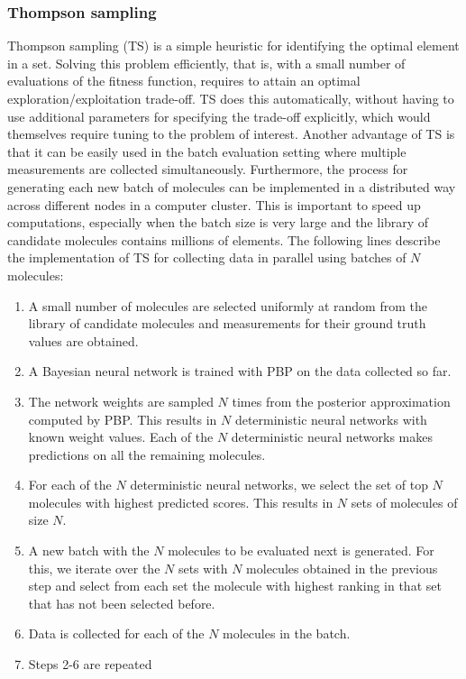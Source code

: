\subsubsection{Thompson sampling}

Thompson sampling (TS) \cite{Thompson_1933} is a simple heuristic for identifying the optimal element in a set. Solving this problem efficiently, that is, with a small number of evaluations of the fitness function, requires to attain an optimal exploration/exploitation trade-off. TS does this automatically, without having to use additional parameters for specifying the trade-off explicitly, which would themselves require tuning to the problem of interest. Another advantage of TS is that it can be easily used
in the batch evaluation setting where multiple measurements are collected simultaneously. Furthermore, the process for generating each new batch of molecules can be implemented in a distributed way across different nodes in a computer cluster. This is important to speed up computations, especially when the batch size is very large and the library of candidate molecules contains millions of elements. The following lines describe the implementation of TS for collecting data in parallel using batches of $N$ molecules:
\begin{enumerate}
\item A small number of molecules are selected uniformly at random from the library of candidate molecules and measurements for their ground truth values are obtained.
\item A Bayesian neural network is trained with PBP on the data collected so far.
\item The network weights are sampled $N$ times from the posterior approximation computed by PBP. This results in $N$ deterministic neural networks with known weight values. Each of the $N$ deterministic neural networks makes predictions on all the remaining molecules. 
\item For each of the $N$ deterministic neural networks, we select the set of top $N$ molecules with highest predicted scores. This results in $N$ sets of molecules of size $N$.
\item A new batch with the $N$ molecules to be evaluated next is generated. For this, we iterate over the $N$ sets with $N$ molecules obtained in the previous step and select from each set the molecule with highest ranking in that set that has not been selected before.
\item Data is collected for each of the $N$ molecules in the batch.
\item Steps 2-6 are repeated
\end{enumerate}

